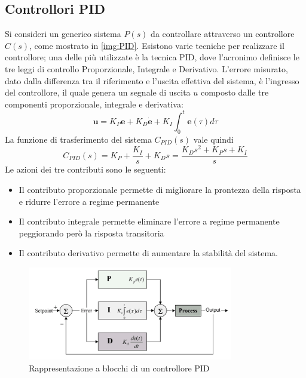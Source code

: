 \subsection{Controllori PID}
Si consideri un generico sistema $P(s)$ da controllare attraverso un controllore $C(s)$, come mostrato in \autoref{img:PID}. Esistono varie tecniche per realizzare il controllore; una delle più utilizzate è la tecnica PID, dove l'acronimo definisce le tre leggi di controllo Proporzionale, Integrale e Derivativo. L'errore misurato, dato dalla differenza tra il riferimento e l'uscita effettiva del sistema, è l'ingresso del controllore, il quale genera un segnale di uscita $u$ composto dalle tre componenti 
    proporzionale, integrale e derivativa:
    \begin{displaymath}
      \boldsymbol{u} = K_P  \boldsymbol{e}  + K_D  \dot{ \boldsymbol{e}} + K_I \int_{0}^t  \boldsymbol{e}(\tau) d\tau 
    \end{displaymath}
  La funzione di trasferimento del sistema $C_{PID}(s)$ vale quindi 
  \begin{displaymath}
    C_{PID}(s)=K_P + \frac{K_I}{s}+ K_Ds = \frac{K_Ds^2 + K_Ps + K_I}{s}
  \end{displaymath}
  Le azioni dei tre contributi sono le seguenti:
  \begin{itemize}
    \item Il contributo proporzionale permette di migliorare la prontezza della risposta e ridurre l'errore a regime permanente
    \item Il contributo integrale permette eliminare l'errore a regime permanente peggiorando però la risposta transitoria
    \item Il contributo derivativo permette di aumentare la stabilità del sistema.
  \end{itemize}
    \begin{figure}[h]
      \centering
      \includegraphics[width=0.8\textwidth]{img/PID.png}
      \caption{Rappresentazione a blocchi di un controllore PID}
      \label{img:PID}
    \end{figure}
    \noindent

